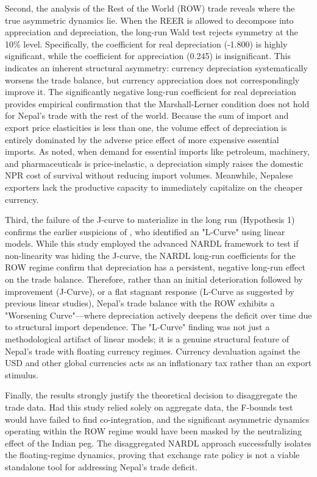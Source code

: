 \documentclass[12pt]{article}
\begin{document}
Second, the analysis of the Rest of the World (ROW) trade reveals where the true asymmetric dynamics lie. When the REER is allowed to decompose into appreciation and depreciation, the long-run Wald test rejects symmetry at the 10\% level. Specifically, the coefficient for real depreciation (-1.800) is highly significant, while the coefficient for appreciation (0.245) is insignificant. This indicates an inherent structural asymmetry: currency depreciation systematically worsens the trade balance, but currency appreciation does not correspondingly improve it. The significantly negative long-run coefficient for real depreciation provides empirical confirmation that the Marshall-Lerner condition does not hold for Nepal's trade with the rest of the world. Because the sum of import and export price elasticities is less than one, the volume effect of depreciation is entirely dominated by the adverse price effect of more expensive essential imports. As \textcite{pathak2020} noted, when demand for essential imports like petroleum, machinery, and pharmaceuticals is price-inelastic, a depreciation simply raises the domestic NPR cost of survival without reducing import volumes. Meanwhile, Nepalese exporters lack the productive capacity to immediately capitalize on the cheaper currency.

Third, the failure of the J-curve to materialize in the long run (Hypothesis 1) confirms the earlier suspicions of \textcite{chaulagai2015}, who identified an "L-Curve" using linear models. While this study employed the advanced NARDL framework to test if non-linearity was hiding the J-curve, the NARDL long-run coefficients for the ROW regime confirm that depreciation has a persistent, negative long-run effect on the trade balance. Therefore, rather than an initial deterioration followed by improvement (J-Curve), or a flat stagnant response (L-Curve as suggested by previous linear studies), Nepal's trade balance with the ROW exhibits a "Worsening Curve"—where depreciation actively deepens the deficit over time due to structural import dependence. The "L-Curve" finding was not just a methodological artifact of linear models; it is a genuine structural feature of Nepal's trade with floating currency regimes. Currency devaluation against the USD and other global currencies acts as an inflationary tax rather than an export stimulus.

Finally, the results strongly justify the theoretical decision to disaggregate the trade data. Had this study relied solely on aggregate data, the F-bounds test would have failed to find co-integration, and the significant asymmetric dynamics operating within the ROW regime would have been masked by the neutralizing effect of the Indian peg. The disaggregated NARDL approach successfully isolates the floating-regime dynamics, proving that exchange rate policy is not a viable standalone tool for addressing Nepal's trade deficit.
\end{document}
